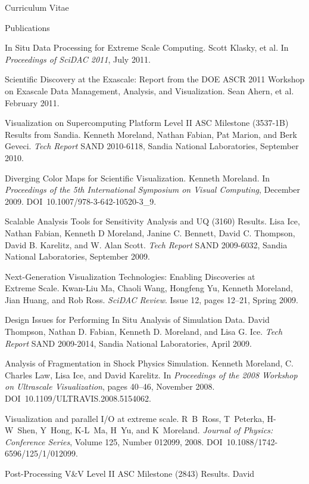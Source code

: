 \documentclass{article}
\begin{document}
\begin{cv}{Curriculum Vitae}
\begin{cvlist}{Publications}
    \item[In Situ Data Processing for Extreme Scale Computing.] Scott
      Klasky, et al. In \emph{Proceedings of SciDAC 2011}, July 2011.
    \item[Scientific Discovery at the Exascale: Report from the DOE ASCR
      2011] Workshop on Exascale Data Management, Analysis, and
      Visualization. Sean Ahern, et al. February 2011.
    \item[Visualization on Supercomputing Platform Level II ASC Milestone]
      (3537-1B) Results from Sandia. Kenneth Moreland, Nathan Fabian, Pat
      Marion, and Berk Geveci. \emph{Tech Report} SAND 2010-6118, Sandia
      National Laboratories, September 2010.
    \item[Diverging Color Maps for Scientific Visualization.] Kenneth
      Moreland. In \emph{Proceedings of the 5th International Symposium on
        Visual Computing}, December 2009. DOI~10.1007/978-3-642-10520-3\_9.
    \item[Scalable Analysis Tools for Sensitivity Analysis and UQ (3160)
      Results.] Lisa Ice, Nathan Fabian, Kenneth D Moreland, Janine
      C. Bennett, David C. Thompson, David B. Karelitz, and W. Alan
      Scott. \emph{Tech Report} SAND 2009-6032, Sandia National
      Laboratories, September 2009.
    \item[Next-Generation Visualization Technologies: Enabling Discoveries
      at]~\\ Extreme Scale. Kwan-Liu Ma, Chaoli Wang, Hongfeng Yu, Kenneth
      Moreland, Jian Huang, and Rob Ross. \emph{SciDAC Review}. Issue 12,
      pages 12--21, Spring 2009.
    \item[Design Issues for Performing In Situ Analysis of Simulation
      Data.] David Thompson, Nathan D. Fabian, Kenneth D. Moreland, and
      Lisa G. Ice. \emph{Tech Report} SAND 2009-2014, Sandia National
      Laboratories, April 2009.
    \item[Analysis of Fragmentation in Shock Physics Simulation.] Kenneth
      Moreland, C. Charles Law, Lisa Ice, and David Karelitz. In
      \emph{Proceedings of the 2008 Workshop on Ultrascale Visualization},
      pages 40--46, November 2008. DOI~10.1109/ULTRAVIS.2008.5154062.
    \item[Visualization and parallel I/O at extreme scale.] R~B~Ross,
      T~Peterka, H-W~Shen, Y~Hong, K-L~Ma, H~Yu, and
      K~Moreland. \emph{Journal of Physics: Conference Series}, Volume 125,
      Number 012099, 2008. DOI~10.1088/1742-6596/125/1/012099.
    \item[Post-Processing V\&V Level II ASC Milestone (2843) Results.] David

\end{cvlist}
\end{cv}
\end{document}
